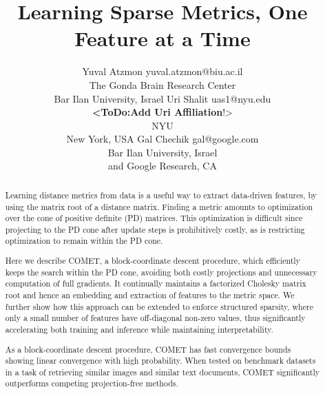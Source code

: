 \documentclass[twoside,11pt]{article}
\newcommand\todo[1]{\textbf{<ToDo:#1}!>}
\begin{document}
\title{Learning Sparse Metrics, One Feature at a Time}


\author{\name Yuval Atzmon \email yuval.atzmon@biu.ac.il \\
       \addr The Gonda Brain Research Center\\
       Bar Ilan University, Israel
       \AND
       \name Uri Shalit \email uas1@nyu.edu \\
       \addr \todo{Add Uri Affiliation}\\
       NYU\\
       New York, USA
       \AND
      \name Gal Chechik \email gal@google.com \\
       \addr Bar Ilan University, Israel\\
       and Google Research, CA}
\editor{\todo{Editor Name?} }

\maketitle

\begin{abstract}%

Learning distance metrics from data is a useful way to extract data-driven features, by using the matrix root of a distance matrix. Finding a metric amounts to optimization over the cone of positive definite (PD) matrices. This optimization is difficult since projecting to the PD cone after update steps is prohibitively costly, as is restricting optimization to remain within the PD cone.

Here we describe COMET, a block-coordinate descent procedure, which efficiently keeps the search within the PD cone, avoiding both costly projections and unnecessary computation of full gradients. It continually maintains a factorized Cholesky matrix root and hence an embedding and extraction of features to the metric space. We further show how this approach can be extended to enforce structured sparsity, where only a small number of features have off-diagonal non-zero values, thus significantly accelerating both training and inference while maintaining interpretability. 

As a block-coordinate descent procedure, COMET has fast convergence bounds showing linear convergence with high probability. When tested on benchmark datasets in a task of retrieving similar images and similar text documents, COMET significantly outperforms competing projection-free methods.


\end{abstract}
\end{document}

